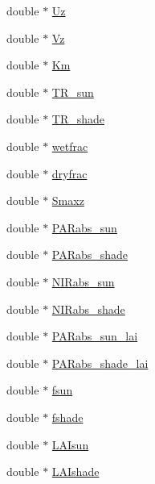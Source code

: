 \begin{DoxyCompactItemize}
\item 
double $\ast$ \hyperlink{class_vertical_canopy_class_a793c9ab77d23d4d8bdc8551334cebf68}{Uz}
\item 
double $\ast$ \hyperlink{class_vertical_canopy_class_a9bc5485012fc58bb7fd579a7741bba33}{Vz}
\item 
double $\ast$ \hyperlink{class_vertical_canopy_class_adff8d87aeb921ec9dea9031cd933f956}{Km}
\item 
double $\ast$ \hyperlink{class_vertical_canopy_class_aaa2faf5e82333cfcb39f9dded31f1bfb}{T\+R\+\_\+sun}
\item 
double $\ast$ \hyperlink{class_vertical_canopy_class_afd471347ec772218c625c615244d9505}{T\+R\+\_\+shade}
\item 
double $\ast$ \hyperlink{class_vertical_canopy_class_a01e28f11269ed90741ae8f67754a5112}{wetfrac}
\item 
double $\ast$ \hyperlink{class_vertical_canopy_class_a68b0e6c5821a1b44ef7899f0a1ba14b7}{dryfrac}
\item 
double $\ast$ \hyperlink{class_vertical_canopy_class_a0955c3b21243b104f8d9bc79bc785126}{Smaxz}
\item 
double $\ast$ \hyperlink{class_vertical_canopy_class_a4691b408ff3c8356fe1369533624ffd7}{P\+A\+Rabs\+\_\+sun}
\item 
double $\ast$ \hyperlink{class_vertical_canopy_class_afdaa160d17cbba27ea0d2fd74780e983}{P\+A\+Rabs\+\_\+shade}
\item 
double $\ast$ \hyperlink{class_vertical_canopy_class_aa55f7f1519ccc81fa333848f7c71f712}{N\+I\+Rabs\+\_\+sun}
\item 
double $\ast$ \hyperlink{class_vertical_canopy_class_a7846c002cf2bc20dd9981277b98a8b77}{N\+I\+Rabs\+\_\+shade}
\item 
double $\ast$ \hyperlink{class_vertical_canopy_class_a0f3882346a876df1dc995a2afb1608b1}{P\+A\+Rabs\+\_\+sun\+\_\+lai}
\item 
double $\ast$ \hyperlink{class_vertical_canopy_class_a916621ee20b367b1d36485b998c4c2af}{P\+A\+Rabs\+\_\+shade\+\_\+lai}
\item 
double $\ast$ \hyperlink{class_vertical_canopy_class_a3341a432a2864be4e6891ee47762947c}{fsun}
\item 
double $\ast$ \hyperlink{class_vertical_canopy_class_ab894c5663f9b391a0193476c4dd5c826}{fshade}
\item 
double $\ast$ \hyperlink{class_vertical_canopy_class_ae006e64569f80119c9dc9f7530bd9bb3}{L\+A\+Isun}
\item 
double $\ast$ \hyperlink{class_vertical_canopy_class_a593944bb51ac7a4669d4d0d63f20c36f}{L\+A\+Ishade}

\end{DoxyCompactItemize}
